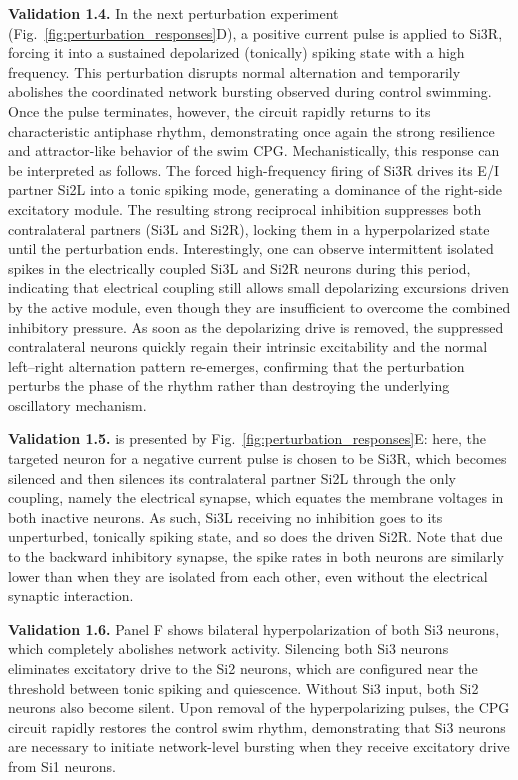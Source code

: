 \documentclass[nofootinbib,aip,amsmath,amssymb,preprint,twocolumn,floatfix,10pt]{revtex4-2}
\begin{document}
{\bf Validation 1.4.} In the next perturbation experiment (Fig.~\ref{fig:perturbation_responses}D), a positive current pulse is applied to Si3R, forcing it into a sustained depolarized (tonically) spiking state with a high frequency. This perturbation disrupts normal alternation and temporarily abolishes the coordinated network bursting observed during control swimming. Once the pulse terminates, however, the circuit rapidly returns to its characteristic antiphase rhythm, demonstrating once again the strong resilience and attractor-like behavior of the swim CPG.
Mechanistically, this response can be interpreted as follows. The forced high-frequency firing of Si3R drives its E/I partner Si2L into a tonic spiking mode, generating a dominance of the right-side excitatory module. The resulting strong reciprocal inhibition suppresses both contralateral partners (Si3L and Si2R), locking them in a hyperpolarized state until the perturbation ends. Interestingly, one can observe intermittent isolated spikes in the electrically coupled Si3L and Si2R neurons during this period, indicating that electrical coupling still allows small depolarizing excursions driven by the active module, even though they are insufficient to overcome the combined inhibitory pressure. As soon as the depolarizing drive is removed, the suppressed contralateral neurons quickly regain their intrinsic excitability and the normal left--right alternation pattern re-emerges, confirming that the perturbation perturbs the phase of the rhythm rather than destroying the underlying oscillatory mechanism.



{\bf Validation 1.5.} is presented by Fig.~\ref{fig:perturbation_responses}E: here, the targeted neuron for a negative current pulse is chosen to be Si3R, which becomes silenced and then silences its contralateral partner Si2L through the only coupling, namely the electrical synapse, which equates the membrane voltages in both inactive neurons. As such, Si3L receiving no inhibition goes to its unperturbed, tonically spiking state, and so does the driven Si2R. Note that due to the backward inhibitory synapse, the spike rates in both neurons are similarly lower than when they are isolated from each other, even without the electrical synaptic interaction.

{\bf Validation 1.6.}
Panel F shows bilateral hyperpolarization of both Si3 neurons, which completely abolishes network activity. Silencing both Si3 neurons eliminates excitatory drive to the Si2 neurons, which are configured near the threshold between tonic spiking and quiescence. Without Si3 input, both Si2 neurons also become silent. Upon removal of the hyperpolarizing pulses, the CPG circuit rapidly restores the control swim rhythm, demonstrating that Si3 neurons are necessary to initiate network-level bursting when they receive excitatory drive from Si1 neurons.
\end{document}
